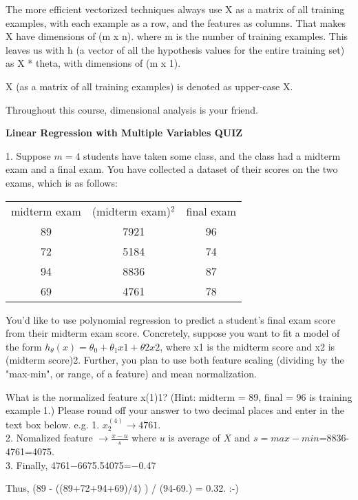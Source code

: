 \documentclass[11pt,a4paper]{article}
\begin{document}
    The more efficient vectorized techniques always use X as a matrix of
    all training examples, with each example as a row, and the features as
    columns. That makes X have dimensions of (m x n). where m is the
    number of training examples. This leaves us with h (a vector of all
    the hypothesis values for the entire training set) as X * theta, with
    dimensions of (m x 1).
    
    X (as a matrix of all training examples) is denoted as upper-case X.
    
    Throughout this course, dimensional analysis is your friend.
    

{\bf Linear Regression with Multiple Variables QUIZ}

1. Suppose $m=4$ students have taken some class, and the class had a midterm exam and a final exam. You have collected a dataset of their scores on the two exams, which is as follows:

\begin{table}
\begin{tabular}{ccc}
midterm exam & 	(midterm exam)$^2$	& final exam\\
89 & 7921 &	96\\
72 & 5184 &	74\\
94 & 8836 &	87\\
69 & 4761 &	78\\
\end{tabular}
\end{table}

You'd like to use polynomial regression to predict a student's final exam score from their midterm exam score. Concretely, suppose you want to fit a model of the form $h_{\theta}(x)={\theta}_{0} +{\theta}_{1} x 1+θ2x2$, where x1 is the midterm score and x2 is (midterm score)2. Further, you plan to use both feature scaling (dividing by the "max-min", or range, of a feature) and mean normalization.

What is the normalized feature x(1)1? (Hint: midterm = 89, final = 96 is training example 1.) Please round off your answer to two decimal places and enter in the text box below.
e.g. 
1. $x_2^{(4)} \rightarrow 4761.$ \\
2. Nomalized feature $\rightarrow \frac{x-u}{s}$ where $u$ is average of $X$ and $s=max - min$=8836-4761=4075. \\
3. Finally, 4761−6675.54075=−0.47

Thus, (89 - ((89+72+94+69)/4) ) / (94-69.) = 0.32. :-) \\ 
\end{document}
